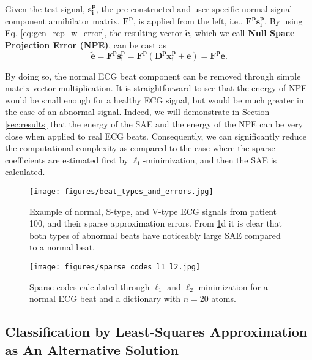 \documentclass[journal,transmag]{IEEEtran}
\begin{document}
Given the test signal, $\bm{s^p_i}$, the pre-constructed and user-specific normal signal component annihilator matrix, $\bm{F^p}$, is applied from the left, i.e., $\bm{F^p}  \bm{s^p_i}$. By using Eq. \eqref{eq:gen_rep_w_error}, the resulting vector $\widetilde{\bm{e}}$, which we call \textbf{Null Space Projection Error (NPE)}, can be cast as
\begin{equation}
\widetilde{\bm{e}} = \bm{F^p} \bm{s^p_i}=   \bm{F^p} \left(  \bm{{D^p}} \bm{x^p_i} + \bm{e} \right) = \bm{F^p} \bm{e}. \label{eq:NPE}
\end{equation}

By doing so, the normal ECG beat component can be removed through simple matrix-vector multiplication. It is straightforward to see that the energy of NPE would be small enough for a healthy ECG signal, but would be much greater in the case of an abnormal signal. Indeed, we will demonstrate in Section \ref{sec:results} that the energy of the SAE and the energy of the NPE can be very close when applied to real ECG beats. Consequently, we can significantly reduce the computational complexity as compared to the case where the sparse coefficients are estimated first by $\ell_1$-minimization, and then the SAE is calculated.  

\begin{figure}[!htbp]
    \captionsetup{font=footnotesize}
    \centering
    \texttt{[image: figures/beat\_types\_and\_errors.jpg]}
    \caption{Example of normal, S-type, and V-type ECG signals from patient 100, and their sparse approximation errors. From \ref{fig:beat_types_and_errors}d it is clear that both types of abnormal beats have noticeably large SAE compared to a normal beat.}
    \label{fig:beat_types_and_errors}
\end{figure}



\begin{figure}[!htbp]
    \captionsetup{font=footnotesize}
    \centering
    \texttt{[image: figures/sparse\_codes\_l1\_l2.jpg]}
    \caption{Sparse codes calculated through $\ell_1$ and $\ell_2$ minimization for a normal ECG beat and a dictionary with $n=20$ atoms.}
    \label{fig:sparse_codes_l1_l2}
\end{figure}

\subsection{Classification by Least-Squares Approximation as An Alternative Solution} \label{sec:LAE}
\end{document}
